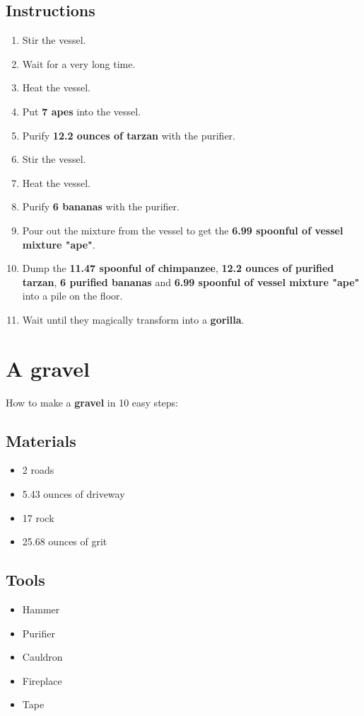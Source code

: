 \documentclass{article}
\begin{document}
\subsection{Instructions}\begin{enumerate}
\item 
Stir the vessel.
\item 
Wait for a very long time.
\item 
Heat the vessel.
\item 
Put \textbf{7 apes} into the vessel.
\item 
Purify \textbf{12.2 ounces of tarzan} with the purifier.
\item 
Stir the vessel.
\item 
Heat the vessel.
\item 
Purify \textbf{6 bananas} with the purifier.
\item 
Pour out the mixture from the vessel to get the \textbf{6.99 spoonful of vessel mixture "ape"}.
\item 
Dump the \textbf{11.47 spoonful of chimpanzee}, \textbf{12.2 ounces of purified tarzan}, \textbf{6 purified bananas} and \textbf{6.99 spoonful of vessel mixture "ape"} into a pile on the floor.
\item 
Wait until they magically transform into a \textbf{gorilla}.
\end{enumerate}
\newpage
\section{A gravel}How to make a \textbf{gravel} in 10 easy steps:

\subsection{Materials}\begin{itemize}
\item 
2 roads
\item 
5.43 ounces of driveway
\item 
17 rock
\item 
25.68 ounces of grit
\end{itemize}
\subsection{Tools}\begin{itemize}
\item 
Hammer
\item 
Purifier
\item 
Cauldron
\item 
Fireplace
\item 
Tape
\end{itemize}
\end{document}
